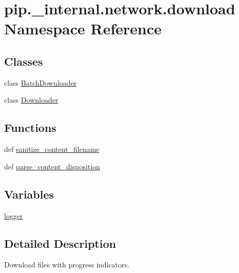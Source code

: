 \hypertarget{namespacepip_1_1__internal_1_1network_1_1download}{}\section{pip.\+\_\+internal.\+network.\+download Namespace Reference}
\label{namespacepip_1_1__internal_1_1network_1_1download}
\subsection*{Classes}
\begin{DoxyCompactItemize}
\item 
class \hyperlink{classpip_1_1__internal_1_1network_1_1download_1_1BatchDownloader}{Batch\+Downloader}
\item 
class \hyperlink{classpip_1_1__internal_1_1network_1_1download_1_1Downloader}{Downloader}
\end{DoxyCompactItemize}
\subsection*{Functions}
\begin{DoxyCompactItemize}
\item 
def \hyperlink{namespacepip_1_1__internal_1_1network_1_1download_a7c62ca2cb1ef2ef10818790a4b8a5345}{sanitize\+\_\+content\+\_\+filename}
\item 
def \hyperlink{namespacepip_1_1__internal_1_1network_1_1download_a4153b361ee88d77fa0896933b977383e}{parse\+\_\+content\+\_\+disposition}
\end{DoxyCompactItemize}
\subsection*{Variables}
\begin{DoxyCompactItemize}
\item 
\hyperlink{namespacepip_1_1__internal_1_1network_1_1download_a502f6c96b5e357b7f9e35d56085ea942}{logger}
\end{DoxyCompactItemize}


\subsection{Detailed Description}
\begin{DoxyVerb}Download files with progress indicators.
\end{DoxyVerb}
 

